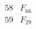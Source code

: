 \documentclass{article}
\begin{document}
{$$\begin{array}{|r|*{7}{r|}}
 & 
 & 
 & 
 & 
\\
\hline
58 
 & F_{66} &
 & 
 & 
 & 
 & 
 & 
\\
\hline
59 
 & F_{29} &
 & 
 & 
 & 
 & 
 & 

\end{array}$$}
\end{document}
